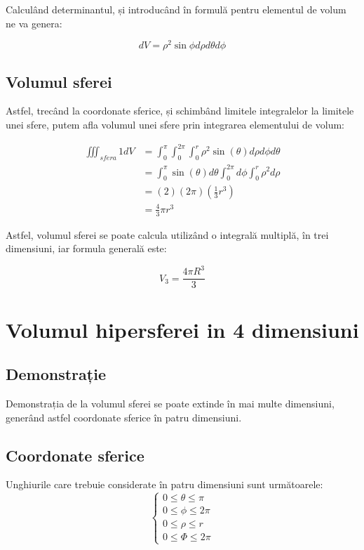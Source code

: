 \documentclass[12pt]{caltech_thesis}
\begin{document}
Calculând determinantul, și introducând în formulă pentru elementul de volum ne va genera:

$$
d V=\rho^{2} \sin \phi d \rho d \theta d \phi
$$

\section{Volumul sferei}

Astfel, trecând la coordonate sferice, și schimbând limitele integralelor la limitele unei sfere, putem afla volumul unei sfere prin integrarea elementului de volum:

$$
\begin{aligned}
\iiint_{sfera} 1 d V
&=\int_{0}^{\pi} \int_{0}^{2 \pi} \int_{0}^{r} \rho^{2} \sin (\theta) d \rho d \phi d \theta \\
&=\int_{0}^{\pi} \sin (\theta) d \theta \int_{0}^{2 \pi} d \phi \int_{0}^{r} \rho^{2} d \rho \\
&=(2)(2 \pi)\left(\frac{1}{3} r^{3}\right) \\
&=\frac{4}{3} \pi r^{3}
\end{aligned}
$$



Astfel, volumul sferei se poate calcula utilizând o integrală multiplă, în trei dimensiuni, iar formula generală este:

$$
V_3 = \frac{4\pi R^3}{3}
$$


\chapter{Volumul hipersferei in 4 dimensiuni}

\section{Demonstrație}

Demonstrația de la volumul sferei se poate extinde în mai multe dimensiuni, generând astfel coordonate sferice în patru dimensiuni.

\section{Coordonate sferice}

Unghiurile care trebuie considerate în patru dimensiuni sunt următoarele:
$$
\begin{cases}
0 \leq \theta \leq \pi \\
0 \leq \phi \leq 2\pi \\
0 \leq \rho \leq r \\
0 \leq \Phi \leq 2\pi
\end{cases}
$$
\end{document}

